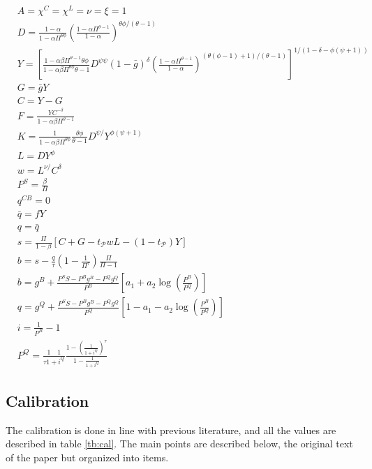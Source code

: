 \documentclass[12pt]{article}
\begin{document}
\begingroup
\allowdisplaybreaks
\begin{align*}
& A=\chi^{C}=\chi^{L}=\nu=\xi=1 \\
& D=\frac{1-\alpha}{1-\alpha \Pi^{\theta \phi}}\left(\frac{1-\alpha \Pi^{\theta-1}}{1-\alpha}\right)^{\theta \phi /(\theta-1)} \\
& Y=\left[\frac{1-\alpha \beta \Pi^{\theta-1} \theta \phi}{1-\alpha \beta \Pi^{\theta \phi} \theta-1} D^{\psi \psi}(1-\bar{g})^{\delta}\left(\frac{1-\alpha \Pi^{\theta-1}}{1-\alpha}\right)^{(\theta(\phi-1)+1) /(\theta-1)}\right]^{1 /(1-\delta-\phi(\psi+1))} \\
& G=\bar{g} Y \\
& C=Y-G \\
& F=\frac{Y C^{-\delta}}{1-\alpha \beta \Pi^{\theta-1}} \\
& K=\frac{1}{1-\alpha \beta \Pi^{\theta \phi}} \frac{\theta \phi}{\theta-1} D^{\psi /} Y^{\phi(\psi+1)} \\
& L=D Y^{\phi}\\
& w=L^{\nu /} C^{\delta} \\
& P^{S}=\frac{\beta}{\Pi} \\
& q^{C B}=0 \\
& \bar{q}=f Y \\
& q=\bar{q} \\
& s=\frac{\Pi}{1-\beta}\left[C+G-t_{\mathcal{P}} w L-\left(1-t_{\mathcal{P}}\right) Y\right] \\
& b=s-\frac{q}{\tau}\left(1-\frac{1}{\Pi^{\tau}}\right) \frac{\Pi}{\Pi-1}\\
& b=g^{B}+\frac{P^{S} S-P^{B} g^{B}-P^{Q} g^{Q}}{P^{B}}\left[a_{1}+a_{2} \log \left(\frac{P^{B}}{P^{Q}}\right)\right] \\
& q=g^{Q}+\frac{P^{S} S-P^{B} g^{B}-P^{Q} g^{Q}}{P^{Q}}\left[1-a_{1}-a_{2} \log \left(\frac{P^{B}}{P^{Q}}\right)\right]\\
& i=\frac{1}{P^{B}}-1\\
& P^{Q}=\frac{1 \quad 1}{\tau 1+i^{Q}} \frac{1-\left(\frac{1}{1+i^{Q}}\right)^{\tau}}{1-\frac{1}{1+i^{Q}}}
\end{align*}
\endgroup

\renewcommand{\theequation}{\arabic{equation}}


\subsection{Calibration}

The calibration is done in line with previous literature, and all the values are described in table \ref{tb:cal}. The main points are described below, the original text of the paper but organized into items.
\end{document}
